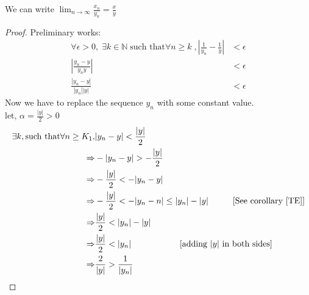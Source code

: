 \documentclass{article}
\newcommand{\Rw}{\Rightarrow}
\newcommand{\hs}{\hspace}
\newcommand{\ds}{\displaystyle}
\begin{document}
\begin{theorem}{}{}
        We can write $\ds\lim_{n\to\infty}\frac{x_n}{y_n}=\frac{x}{y}$
\begin{proof}
    Preliminary works: \\
    \begin{align*}
        \forall\epsilon>0,\; \exists k \in \mathbb{N}\; \text{such that} \forall n\geq k\; ,|\frac{1}{y_n}-\frac{1}{y}| & <\epsilon \\
        |\frac{y_n-y}{y_n y}|                                                                                           & <\epsilon \\
        \frac{|y_n-y|}{|y_n||y|}                                                                                        & <\epsilon
    \end{align*}
    Now we have to replace the sequence $y_n$ with some constant value.\\
    let, $\alpha = \frac{|y|}{2}>0$\\
    \begin{align*}
        \exists k, \text{such that} \forall n \geq K_1 , & |y_n-y|  <\frac{|y|}{2}                                                                                    \\
        \Rw                                              & -|y_n-y|                                              >-\frac{|y|}{2}                                    \\
        \Rw                                              & -\frac{|y|}{2}                                        < -|y_n-y|                                             \\
        \Rw                                              & -\frac{|y|}{2}                             <-|y_n-n|\leq |y_n|-|y| \hs{1cm}\text{[See corollary \ref{TE}]} \\
        \Rw                                              & \frac{|y|}{2}<|y_n|-|y|                                                                                     \\
        \Rw                                              & \frac{|y|}{2}<|y_n| \hs{2cm}\text{[adding $|y|$ in both sides]}                                             \\
        \Rw                                              & \frac{2}{|y|}>\frac{1}{|y_n|}                                                                             \\
    \end{align*}

\end{proof}
\end{theorem}
\end{document}

